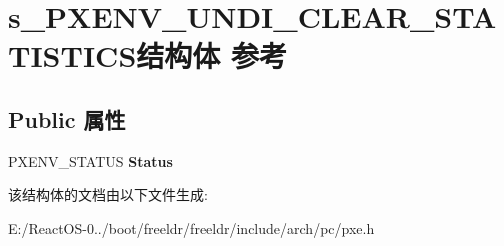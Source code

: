\hypertarget{structs___p_x_e_n_v___u_n_d_i___c_l_e_a_r___s_t_a_t_i_s_t_i_c_s}{}\section{s\+\_\+\+P\+X\+E\+N\+V\+\_\+\+U\+N\+D\+I\+\_\+\+C\+L\+E\+A\+R\+\_\+\+S\+T\+A\+T\+I\+S\+T\+I\+C\+S结构体 参考}
\label{structs___p_x_e_n_v___u_n_d_i___c_l_e_a_r___s_t_a_t_i_s_t_i_c_s}
\subsection*{Public 属性}
\begin{DoxyCompactItemize}
\item 
\mbox{\label{structs___p_x_e_n_v___u_n_d_i___c_l_e_a_r___s_t_a_t_i_s_t_i_c_s_adc6e08cd54ad03c04bf347b0b4ad8aa5}} 
P\+X\+E\+N\+V\+\_\+\+S\+T\+A\+T\+US {\bfseries Status}
\end{DoxyCompactItemize}


该结构体的文档由以下文件生成\+:\begin{DoxyCompactItemize}
\item 
E\+:/\+React\+O\+S-\/0../boot/freeldr/freeldr/include/arch/pc/pxe.\+h\end{DoxyCompactItemize}
